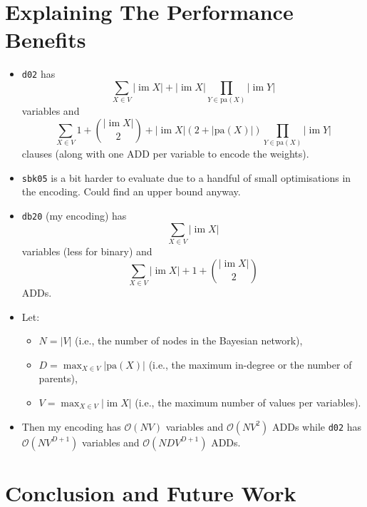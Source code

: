 \documentclass{article}
\theoremstyle{definition}
\theoremstyle{remark}
\DeclareMathOperator{\im}{im}
\begin{document}
\section{Explaining The Performance Benefits}

\begin{itemize}
\item \texttt{d02} has
  \[
    \sum_{X \in V} |\im X| + |\im X|\prod_{Y \in \mathrm{pa}(X)}|\im Y|
  \]
  variables and
  \[
    \sum_{X \in V} 1 + \binom{|\im X|}{2} + |\im X|(2 +
    |\mathrm{pa}(X)|)\prod_{Y \in \mathrm{pa}(X)} |\im Y|
  \]
  clauses (along with one ADD per variable to encode the weights).
\item \texttt{sbk05} is a bit harder to evaluate due to a handful of small
  optimisations in the encoding. Could find an upper bound anyway.
\item \texttt{db20} (my encoding) has
  \[
    \sum_{X \in V} |\im X|
  \]
  variables (less for binary) and
  \[
    \sum_{X \in V} |\im X| + 1 + \binom{|\im X|}{2}
  \]
  ADDs.
\item Let:
  \begin{itemize}
  \item $N = |V|$ (i.e., the number of nodes in the Bayesian network),
  \item $D = \max_{X \in V} |\mathrm{pa}(X)|$ (i.e., the maximum in-degree or
    the number of parents),
  \item $V = \max_{X \in V} |\im X|$ (i.e., the maximum number of values per
    variables).
  \end{itemize}
\item Then my encoding has $\mathcal{O}(NV)$ variables and $\mathcal{O}(NV^2)$
  ADDs while \texttt{d02} has $\mathcal{O}(NV^{D+1})$ variables and
  $\mathcal{O}(NDV^{D+1})$ ADDs.
\end{itemize}


\section{Conclusion and Future Work}
\end{document}
